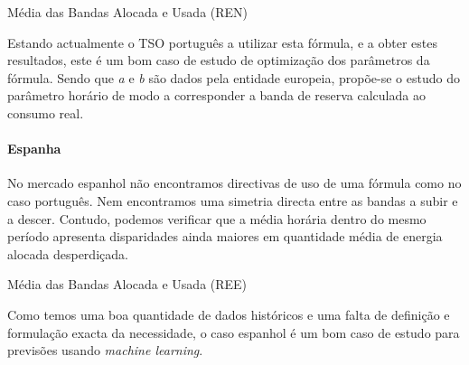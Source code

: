 \begin{table}[H]
	\centering
    \caption{Média das Bandas Alocada e Usada (REN)}    
    \resizebox{!}{!}{}
    \label{tab:media_bandas_pt}
    \end{table}

Estando actualmente o \gls{TSO} português a utilizar esta fórmula, e a obter estes resultados, este é um bom caso de estudo de optimização dos parâmetros da fórmula. Sendo que \textit{a} e \textit{b} são dados pela entidade europeia, propõe-se o estudo do parâmetro horário de modo a corresponder a banda de reserva calculada ao consumo real.\par

\paragraph{Espanha \label{se:prev_espanha}}
\text{ }  \par

No mercado espanhol não encontramos directivas de uso de uma fórmula como no caso português. Nem encontramos uma simetria directa entre as bandas a subir e a descer. Contudo, podemos verificar que a média horária dentro do mesmo período apresenta disparidades ainda maiores em quantidade média de energia alocada desperdiçada.\par

\begin{table}[H]
	\centering
    \caption{Média das Bandas Alocada e Usada (REE)}    
    \resizebox{!}{!}{}
    \label{tab:media_bandas_es}
    \end{table}


Como temos uma boa quantidade de dados históricos e uma falta de definição e formulação exacta da necessidade, o caso espanhol é um bom caso de estudo para previsões usando \textit{machine learning}.\par




\thispagestyle{plain}
